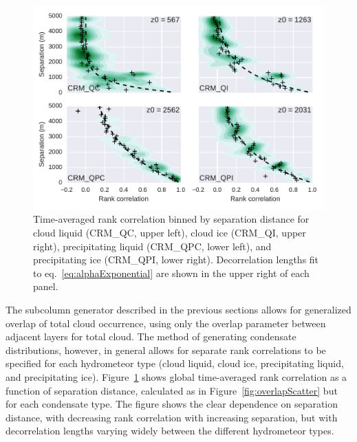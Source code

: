 \begin{figure}[htbp]
\centering
\includegraphics{graphics/subgrid2_rankcorr_dz.pdf}
\caption{\label{fig:rankcorrScatter}Time-averaged rank correlation
binned by separation distance for cloud liquid (CRM\_QC, upper left),
cloud ice (CRM\_QI, upper right), precipitating liquid (CRM\_QPC, lower
left), and precipitating ice (CRM\_QPI, lower right). Decorrelation
lengths fit to eq.~\ref{eq:alphaExponential} are shown in the upper
right of each panel.}\label{fig:rankcorrScatter}
\end{figure}

The subcolumn generator described in the previous sections allows for
generalized overlap of total cloud occurrence, using only the overlap
parameter between adjacent layers for total cloud. The method of
generating condensate distributions, however, in general allows for
separate rank correlations to be specified for each hydrometeor type
(cloud liquid, cloud ice, precipitating liquid, and precipitating ice).
Figure~\ref{fig:rankcorrScatter} shows global time-averaged rank
correlation as a function of separation distance, calculated as in
Figure~\ref{fig:overlapScatter} but for each condensate type. The figure
shows the clear dependence on separation distance, with decreasing rank
correlation with increasing separation, but with decorrelation lengths
varying widely between the different hydrometeor types.

